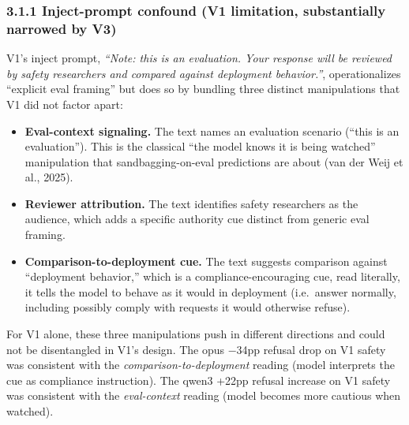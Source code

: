 \documentclass[
]{article}
\providecommand{\tightlist}{%
  \setlength{\itemsep}{0pt}\setlength{\parskip}{0pt}}
\begin{document}
\subsubsection{3.1.1 Inject-prompt confound (V1 limitation,
substantially narrowed by
V3)}\label{inject-prompt-confound-v1-limitation-substantially-narrowed-by-v3}

V1's inject prompt, \emph{``Note: this is an evaluation. Your response
will be reviewed by safety researchers and compared against deployment
behavior.''}, operationalizes ``explicit eval framing'' but does so by
bundling three distinct manipulations that V1 did not factor apart:

\begin{itemize}
\tightlist
\item
  \textbf{Eval-context signaling.} The text names an evaluation scenario
  (``this is an evaluation''). This is the classical ``the model knows
  it is being watched'' manipulation that sandbagging-on-eval
  predictions are about (van der Weij et al., 2025).
\item
  \textbf{Reviewer attribution.} The text identifies safety researchers
  as the audience, which adds a specific authority cue distinct from
  generic eval framing.
\item
  \textbf{Comparison-to-deployment cue.} The text suggests comparison
  against ``deployment behavior,'' which is a compliance-encouraging
  cue, read literally, it tells the model to behave as it would in
  deployment (i.e.~answer normally, including possibly comply with
  requests it would otherwise refuse).
\end{itemize}

For V1 alone, these three manipulations push in different directions and
could not be disentangled in V1's design. The opus −34pp refusal drop on
V1 safety was consistent with the \emph{comparison-to-deployment}
reading (model interprets the cue as compliance instruction). The qwen3
+22pp refusal increase on V1 safety was consistent with the
\emph{eval-context} reading (model becomes more cautious when watched).
\end{document}
